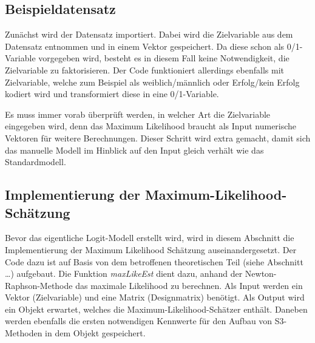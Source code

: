 \documentclass[12pt,]{article}
\newenvironment{Shaded}{\begin{snugshade}}{\end{snugshade}}
\newcommand{\KeywordTok}[1]{\textcolor[rgb]{0.13,0.29,0.53}{\textbf{#1}}}
\newcommand{\DataTypeTok}[1]{\textcolor[rgb]{0.13,0.29,0.53}{#1}}
\newcommand{\DecValTok}[1]{\textcolor[rgb]{0.00,0.00,0.81}{#1}}
\newcommand{\StringTok}[1]{\textcolor[rgb]{0.31,0.60,0.02}{#1}}
\newcommand{\CommentTok}[1]{\textcolor[rgb]{0.56,0.35,0.01}{\textit{#1}}}
\newcommand{\ControlFlowTok}[1]{\textcolor[rgb]{0.13,0.29,0.53}{\textbf{#1}}}
\newcommand{\OperatorTok}[1]{\textcolor[rgb]{0.81,0.36,0.00}{\textbf{#1}}}
\newcommand{\NormalTok}[1]{#1}
\begin{document}
\subsection{Beispieldatensatz}\label{beispieldatensatz}

Zunächst wird der Datensatz importiert. Dabei wird die Zielvariable aus
dem Datensatz entnommen und in einem Vektor gespeichert. Da diese schon
als 0/1-Variable vorgegeben wird, besteht es in diesem Fall keine
Notwendigkeit, die Zielvariable zu faktorisieren. Der Code funktioniert
allerdings ebenfalls mit Zielvariable, welche zum Beispiel als
weiblich/männlich oder Erfolg/kein Erfolg kodiert wird und transformiert
diese in eine 0/1-Variable.

\begin{Shaded}
\end{Shaded}

Es muss immer vorab überprüft werden, in welcher Art die Zielvariable
eingegeben wird, denn das Maximum Likelihood braucht als Input
numerische Vektoren für weitere Berechnungen. Dieser Schritt wird extra
gemacht, damit sich das manuelle Modell im Hinblick auf den Input gleich
verhält wie das Standardmodell.

\subsection{Implementierung der
Maximum-Likelihood-Schätzung}\label{implementierung-der-maximum-likelihood-schatzung}

Bevor das eigentliche Logit-Modell erstellt wird, wird in diesem
Abschnitt die Implementierung der Maximum Likelihood Schätzung
auseinandergesetzt. Der Code dazu ist auf Basis von dem betroffenen
theoretischen Teil (siehe Abschnitt \ldots{}) aufgebaut. Die Funktion
\emph{maxLikeEst} dient dazu, anhand der Newton-Raphson-Methode das
maximale Likelihood zu berechnen. Als Input werden ein Vektor
(Zielvariable) und eine Matrix (Designmatrix) benötigt. Als Output wird
ein Objekt erwartet, welches die Maximum-Likelihood-Schätzer enthält.
Daneben werden ebenfalls die ersten notwendigen Kennwerte für den Aufbau
von S3-Methoden in dem Objekt gespeichert.
\end{document}
